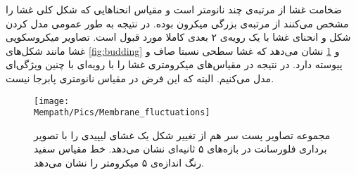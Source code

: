 
ضخامت غشا از مرتبه‌ی چند نانومتر است و مقیاس انحنا‌هایی که شکل کلی غشا را مشخص می‌کنند از مرتبه‌ی بزرگی میکرون بوده. در نتیجه به طور عمومی مدل کردن شکل و انحنای غشا با یک رویه‌ی ۲ بعدی کاملا مورد قبول است. تصاویر میکروسکوپی غشا مانند شکل‌های 
\ref{fig:budding}
و
\ref{fig:flucmem} 
نشان می‌دهد که غشا سطحی نسبتا صاف و پیوسته دارد. در نتیجه در مقیاس‌های میکرومتری غشا را با رویه‌ای با چنین ویژگی‌ای مدل می‌کنیم. البته که این فرض در مقیاس نانومتری پابرجا نیست. 

\begin{figure}[h]
\begin{center}
\texttt{[image: \\Mempath/Pics/Membrane\_fluctuations]}
\caption{
مجموعه تصاویر پست سر هم از تغییر شکل یک غشای لیپیدی را با تصویر برداری فلورسانت در بازه‌های ۵ ثانیه‌ای نشان می‌دهد. خط مقیاس سفید رنگ اندازه‌ی ۵ میکرومتر را نشان می‌دهد. 
\cite{ParthasarathyMembraneMeasurement}
}
\label{fig:flucmem}
\end{center}
\end{figure}

